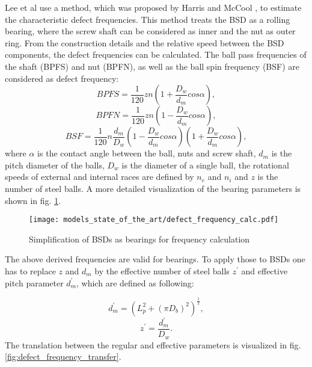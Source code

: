 Lee et al use a method, which was proposed by Harris and McCool \cite{Harris1996}, to estimate the characteristic defect frequencies. This method treats the BSD as a rolling bearing, where the screw shaft can be considered as inner and the nut as outer ring. From the construction details and the relative speed between the BSD components, the defect frequencies can be calculated. The ball pass frequencies of the shaft (BPFS) and nut (BPFN), as well as the ball spin frequency (BSF) are considered as defect frequency: 
\begin{equation}
    BPFS = \frac{1}{120}zn(1+\frac{D_{w}}{d_{m}}cos\alpha),
    \label{eq:defect_frequency}
\end{equation}
\begin{equation}
    BPFN = \frac{1}{120}zn(1-\frac{D_{w}}{d_{m}}cos\alpha),
\end{equation}
\begin{equation}
    BSF = \frac{1}{120}n\frac{d_{m}}{D_{w}} (1-\frac{D_{w}}{d_{m}}cos\alpha)(1+\frac{D_{w}}{d_{m}}cos\alpha) ,
\end{equation}
where $\alpha$ is the contact angle between the ball, nuts and screw shaft, $d_{m}$ is the pitch diameter of the balls, $D_{w}$ is the diameter of a single ball, the rotational speeds of external and internal races are defined by $n_{e}$ and $n_{i}$ and $z$ is the number of steel balls. A more detailed visualization of the bearing parameters is shown in fig. \ref{fig:defect_frequency_calc}. 

\begin{figure}[H]
  \centering
  \texttt{[image: models\_state\_of\_the\_art/defect\_frequency\_calc.pdf]}
  \caption{Simplification of BSDs as bearings for frequency calculation \cite{Lee2015}}
  \label{fig:defect_frequency_calc}
\end{figure}

The above derived frequencies are valid for bearings. To apply those to BSDs one has to replace $z$ and $d_{m}$ by the effective number of steel balls $z^{'}$ and effective pitch parameter $d_{m}^{'}$, which are defined as following:

\begin{equation}
    d_{m}^{'} = (L_{p}^{2}+(\pi D_{b})^{2})^{\frac{1}{2}},
\end{equation}
\begin{equation}
    z^{'} = \frac{d_{m}^{'}}{D_{w}}.
\end{equation}
The translation between the regular and effective parameters is visualized in fig. \ref{fig:defect_frequency_transfer}. 

